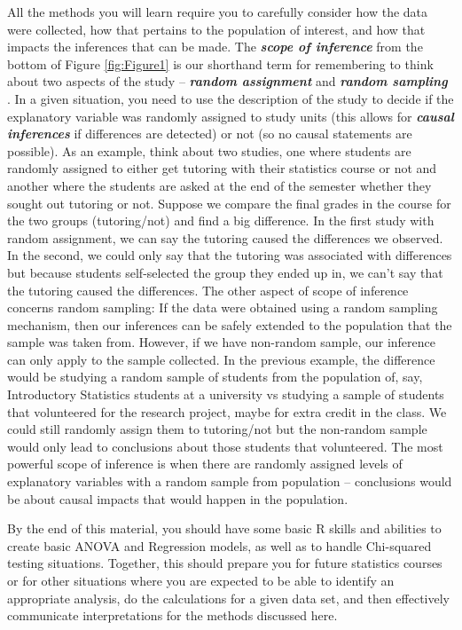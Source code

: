 \documentclass[]{article}
\begin{document}
All the methods you will learn require you to carefully consider how the
data were collected, how that pertains to the population of interest,
and how that impacts the inferences that can be made. The
\textbf{\emph{scope of inference}} from the bottom of Figure
\ref{fig:Figure1} is our shorthand term for remembering to think about
two aspects of the study -- \textbf{\emph{random assignment}} and
\textbf{\emph{random sampling}} . In a given situation, you need to use
the description of the study to decide if the explanatory variable was
randomly assigned to study units (this allows for \textbf{\emph{causal
inferences}} if differences are detected) or not (so no causal
statements are possible). As an example, think about two studies, one
where students are randomly assigned to either get tutoring with their
statistics course or not and another where the students are asked at the
end of the semester whether they sought out tutoring or not. Suppose we
compare the final grades in the course for the two groups (tutoring/not)
and find a big difference. In the first study with random assignment, we
can say the tutoring caused the differences we observed. In the second,
we could only say that the tutoring was associated with differences but
because students self-selected the group they ended up in, we can't say
that the tutoring caused the differences. The other aspect of scope of
inference concerns random sampling: If the data were obtained using a
random sampling mechanism, then our inferences can be safely extended to
the population that the sample was taken from. However, if we have
non-random sample, our inference can only apply to the sample collected.
In the previous example, the difference would be studying a random
sample of students from the population of, say, Introductory Statistics
students at a university vs studying a sample of students that
volunteered for the research project, maybe for extra credit in the
class. We could still randomly assign them to tutoring/not but the
non-random sample would only lead to conclusions about those students
that volunteered. The most powerful scope of inference is when there are
randomly assigned levels of explanatory variables with a random sample
from population -- conclusions would be about causal impacts that would
happen in the population.

By the end of this material, you should have some basic R skills and
abilities to create basic ANOVA and Regression models, as well as to
handle Chi-squared testing situations. Together, this should prepare you
for future statistics courses or for other situations where you are
expected to be able to identify an appropriate analysis, do the
calculations for a given data set, and then effectively communicate
interpretations for the methods discussed here.
\end{document}
